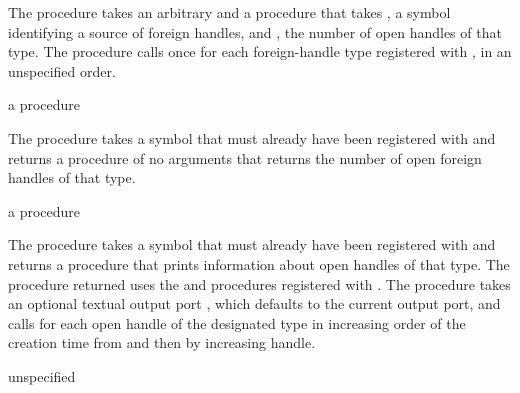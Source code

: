 \begin{procedure}
\end{procedure}
\returns{} 

The  procedure takes an arbitrary  and a
procedure  that takes , a symbol 
identifying a source of foreign handles, and , the number of
open handles of that type.
The  procedure calls  once for
each foreign-handle type registered with ,
in an unspecified order.

\begin{procedure}
\end{procedure}
\returns{} a procedure

The  procedure takes a symbol  that
must already have been registered with 
and returns a procedure of no arguments that returns the number of open foreign
handles of that type.

\begin{procedure}
\end{procedure}
\returns{} a procedure

The  procedure takes a symbol  that
must already have been registered with  and
returns a procedure that prints information about open handles of that type.
The procedure returned uses the  and 
procedures registered with .
The procedure takes an optional textual output port , which defaults
to the current output port, and calls  for each open handle of the
designated type in increasing order of the creation time from 
and then by increasing handle.

\begin{procedure}
\end{procedure}
\returns{} unspecified

